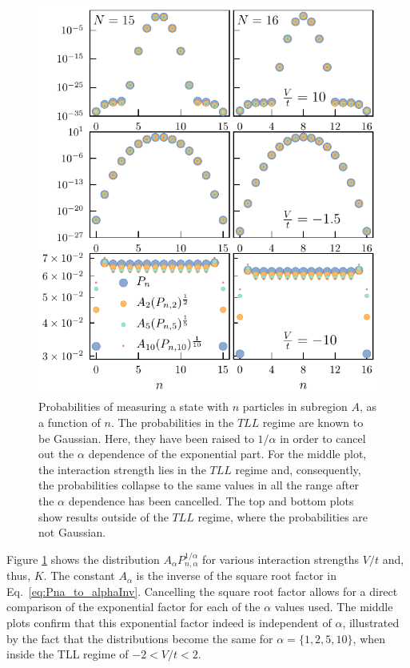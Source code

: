 \begin{figure}[h!]
\begin{center}
\includegraphics[scale=1.1]{Images/alphaCollapse.pdf}
\end{center}
\caption{Probabilities of measuring a state with $n$ particles in subregion $A$, as  a function of $n$. The probabilities in the $TLL$ regime are known to be Gaussian. Here, they have been raised to $1/\alpha$ in order to cancel out the $\alpha$ dependence of the exponential part. For the middle plot, the interaction strength lies in the $TLL$ regime and, consequently, the probabilities collapse to the same values in all the range after the $\alpha$ dependence has been cancelled. The top and bottom plots show results outside of the $TLL$ regime, where the probabilities are not Gaussian.}
\label{fig:alpha_collapse}
\end{figure}
 
 Figure \ref{fig:alpha_collapse} shows the distribution $A_{\alpha} P_{n,\alpha}^{1/\alpha}$ for various interaction strengths $V/t$ and, thus, $K$. The constant $A_{\alpha}$ is the inverse of the square root factor in Eq.~\eqref{eq:Pna_to_alphaInv}. Cancelling the square root factor allows for a direct comparison of the exponential factor for each of the $\alpha$ values used. The middle plots confirm that this exponential factor indeed is independent of $\alpha$, illustrated by the fact that the distributions become the same for $\alpha=\{1,2,5,10\}$, when inside the TLL regime of $-2 < V/t < 2$.
 
